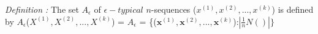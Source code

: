 \documentclass[preview]{standalone}
\begin{document}
\begin{center}
\textit{Definition :} The set $A_{\epsilon}$ of $\epsilon -typical$ $n$-sequences ($x^{(1)},x^{(2)},...,x^{(k)}$) is defined by $A_{\epsilon}$($X^{(1)},X^{(2)},...,X^{(k)}$) = $A_{\epsilon}$ = \{($\textbf{x}^{(1)},\textbf{x}^{(2)},...,\textbf{x}^{(k)}$):$|\frac{1}{n} N()|\}$
\end{center}
\end{document}
